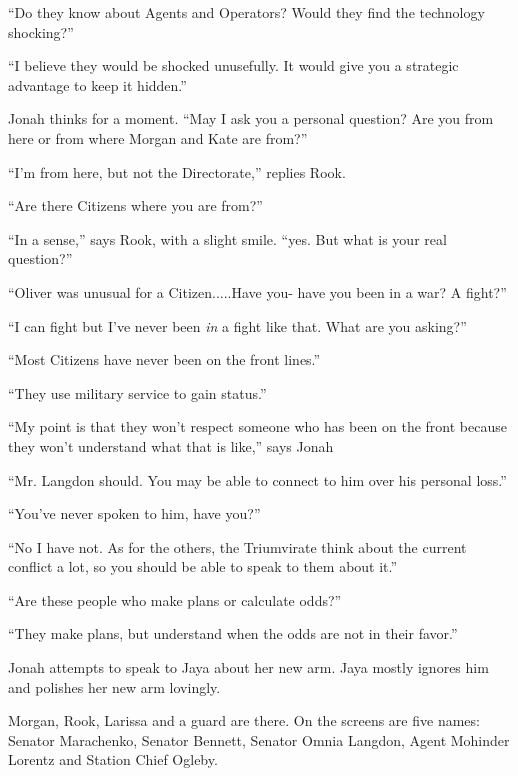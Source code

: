 ``Do they know about Agents and Operators?  Would they find the technology shocking?''

``I believe they would be shocked unusefully.  It would give you a strategic advantage to keep it hidden.''

Jonah thinks for a moment.  ``May I ask you a personal question?  Are you from here or from where Morgan and Kate are from?''

``I'm from here, but not the Directorate,'' replies Rook.

``Are there Citizens where you are from?''

``In a sense,'' says Rook, with a slight smile. ``yes.  But what is your real question?''

``Oliver was unusual for a Citizen.....Have you- have you been in a war?  A fight?''

``I can fight but I've never been \textit{in} a fight like that.  What are you asking?''

``Most Citizens have never been on the front lines.''

``They use military service to gain status.''

``My point is that they won't respect someone who has been on the front because they won't understand what that is like,'' says Jonah

``Mr. Langdon should.  You may be able to connect to him over his personal loss.''

``You've never spoken to him, have you?''

``No I have not.  As for the others, the Triumvirate think about the current conflict a lot, so you should be able to speak to them about it.''

``Are these people who make plans or calculate odds?''

``They make plans, but understand when the odds are not in their favor.''




Jonah attempts to speak to Jaya about her new arm.  Jaya mostly ignores him and polishes her new arm lovingly.


\newpage


Morgan, Rook, Larissa and a guard are there.  On the screens are five names: Senator Marachenko, Senator Bennett, Senator Omnia Langdon, Agent Mohinder Lorentz and Station Chief Ogleby.



